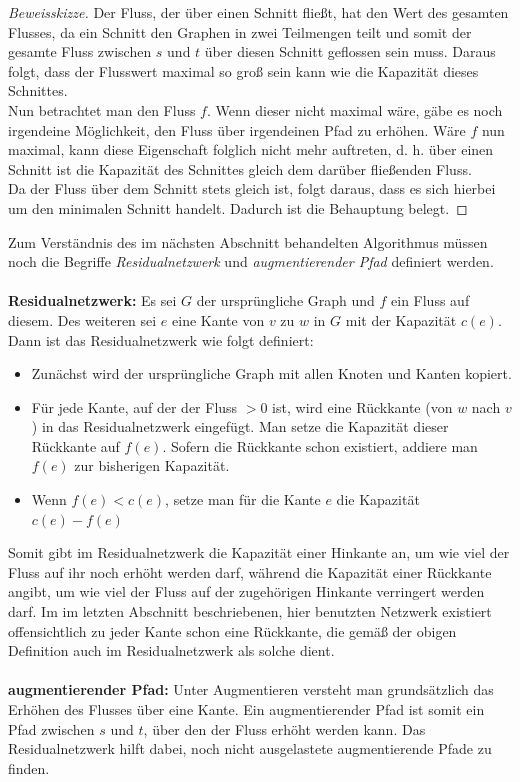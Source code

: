 \documentclass[a4paper, notitlepage, 12pt]{scrartcl}
\begin{document}
\begin{proof}[Beweisskizze]
Der Fluss, der über einen Schnitt fließt, hat den Wert des gesamten Flusses, da ein Schnitt den Graphen in zwei Teilmengen teilt und somit der gesamte Fluss zwischen $s$ und $t$ über diesen Schnitt geflossen sein muss. Daraus folgt, dass der Flusswert maximal so groß sein kann wie die Kapazität dieses Schnittes. \\
Nun betrachtet man den Fluss $f$. Wenn dieser nicht maximal wäre, gäbe es noch irgendeine Möglichkeit, den Fluss über irgendeinen Pfad zu erhöhen. Wäre $f$ nun maximal, kann diese Eigenschaft folglich nicht mehr auftreten, d. h. über einen Schnitt ist die Kapazität des Schnittes gleich dem darüber
fließenden Fluss. \\ Da der Fluss über dem Schnitt stets gleich ist, folgt daraus, dass es sich hierbei um den
minimalen Schnitt handelt. Dadurch ist die Behauptung belegt.
\end{proof}
Zum Verständnis des im nächsten Abschnitt behandelten Algorithmus müssen noch die Begriffe \textit{Residualnetzwerk} und \textit{augmentierender Pfad} definiert werden.
\\ \\
\textbf{Residualnetzwerk:} Es sei $G$ der ursprüngliche Graph und $f$ ein Fluss auf diesem. Des weiteren sei $e$ eine Kante von $v$ zu $w$  in $G$ mit der Kapazität $c(e)$. Dann ist das Residualnetzwerk wie folgt definiert:
\begin{itemize}
\item Zunächst wird der ursprüngliche Graph mit allen Knoten und Kanten kopiert.
\item Für jede Kante, auf der der Fluss $> 0$ ist, wird eine Rückkante (von $w$ nach $v$) in das Residualnetzwerk eingefügt. Man setze die Kapazität dieser Rückkante auf $f(e)$. Sofern die Rückkante schon existiert, addiere man $f(e)$ zur bisherigen Kapazität.
\item Wenn $f(e) < c(e)$, setze man für die Kante $e$ die Kapazität $c(e) - f(e)$
\end{itemize}
Somit gibt im Residualnetzwerk die Kapazität einer Hinkante an, um wie viel der Fluss auf ihr noch erhöht werden darf, während die Kapazität einer Rückkante angibt, um wie viel der Fluss auf der zugehörigen Hinkante verringert werden darf. Im im letzten Abschnitt beschriebenen, hier benutzten Netzwerk existiert offensichtlich zu jeder Kante schon eine Rückkante, die gemäß der obigen Definition auch im Residualnetzwerk als solche dient.
\\ \\
\textbf{augmentierender Pfad:} Unter Augmentieren versteht man grundsätzlich das Erhöhen des Flusses über eine Kante. Ein augmentierender Pfad ist somit ein Pfad zwischen $s$ und $t$, über den der Fluss erhöht werden kann. Das Residualnetzwerk hilft dabei, noch nicht ausgelastete augmentierende Pfade zu finden.
\end{document}
